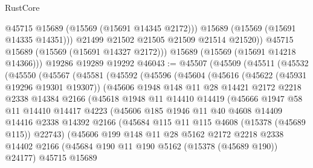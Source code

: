 \begin{lexlean}{RustCore}
\begin{coremodule}
                @45715
                @15689
                (@15569 (@15691 @14345 @2172)))
              @15689
              (@15569 (@15691 @14335 @14351)))
            @21499
            @21502
            @21505
            @21509
            @21514
            @21520))
        @45715
        @15689
        (@15569 (@15691 @14327 @2172)))
      @15689
      (@15569 (@15691 @14218 @14366)))
    @19286
    @19289
    @19292
@46043 := @45507
    (@45509
      (@45511
        (@45532
          (@45550
            (@45567
              (@45581
                (@45592
                  (@45596
                    (@45604
                      (@45616
                        (@45622 (@45931 @19296 @19301 @19307))
                        (@45606
                          @1948
                          @148
                          @11
                          @28
                          @14421
                          @2172
                          @2218
                          @2338
                          @14384
                          @2166
                          (@45618
                            @1948
                            @11
                            @14410
                            @14419
                            (@45666
                              @1947
                              @58
                              @11
                              @14410
                              @14417
                              @4223
                              (@45606
                                @185
                                @1946
                                @11
                                @40
                                @4608
                                @14409
                                @14416
                                @2338
                                @14392
                                @2166
                                (@45684 @115 @11 @115 @4608 (@15378 (@45689 @115)) @22743)
                                (@45606
                                  @199
                                  @148
                                  @11
                                  @28
                                  @5162
                                  @2172
                                  @2218
                                  @2338
                                  @14402
                                  @2166
                                  (@45684 @190 @11 @190 @5162 (@15378 (@45689 @190)) @24177)
                                  @45715
                                  @15689

\end{coremodule}
\end{lexlean}
